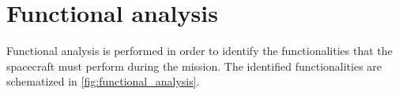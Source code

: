 \section{Functional analysis}
\label{sec:functional_analysis}

Functional analysis is performed in order to identify the functionalities that the spacecraft must perform during the mission. The identified functionalities are schematized in \autoref{fig:functional_analysis}.

